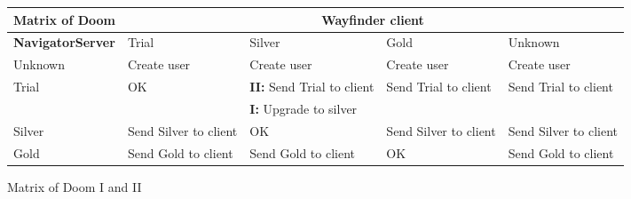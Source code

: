 \newcommand{\newuser}{Create user}
\newcommand{\trial}{Send Trial to client}
\newcommand{\silver}{Send Silver to client}
\newcommand{\gold}{Send Gold to client}

\begin{figure}[hbt]
\begin{centering}
\begin{tabular}{|l||p{17mm}|p{17mm}|p{17mm}|p{17mm}|} \hline
\textbf{Matrix of Doom}  & \multicolumn{4}{|c|}{\textbf{Wayfinder client}}\\\hline\hline
\textbf{NavigatorServer} & Trial & Silver & Gold & Unknown     \\\hline
Unknown & \newuser & \newuser     & \newuser & \newuser        \\\hline
Trial   & OK       & \textbf{II:} \trial   & \trial   & \trial \\\cline{3-3}
        &          & \textbf{I:} Upgrade to silver & &         \\\hline 
Silver  & \silver  & OK           & \silver  & \silver         \\\hline
Gold    & \gold    & \gold        & OK       & \gold           \\\hline 
  \end{tabular}
\caption{Matrix of Doom I and II}
\label{Matrix of Doom figure}
\end{centering}
\end{figure}
